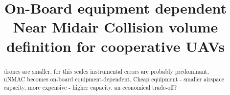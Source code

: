 \documentclass[conference]{IEEEtran}
\begin{document}
\title{On-Board equipment dependent Near Midair Collision volume definition for  cooperative UAVs\\
}

\author{
}

\maketitle

\begin{abstract}
drones are smaller, for this scales instrumental errors are probably predominant, uNMAC becomes on-board equipment-dependent. Cheap equipment - smaller airspace capacity, more expensive - higher capacity. an economical trade-off?
\end{abstract}
\end{document}
